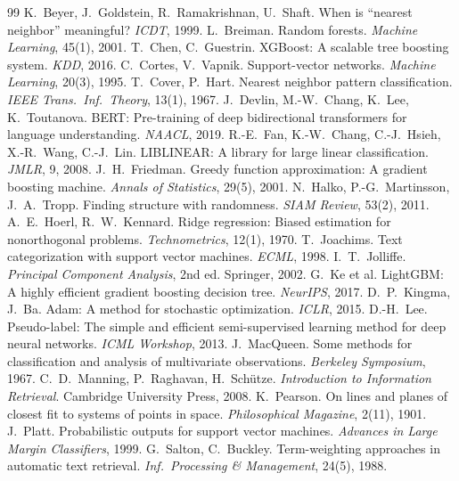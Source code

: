 \documentclass[11pt,a4paper]{article}
\begin{document}
\begin{thebibliography}{99}\small
{} K.~Beyer, J.~Goldstein, R.~Ramakrishnan, U.~Shaft. When is ``nearest neighbor'' meaningful? \emph{ICDT}, 1999.
 L.~Breiman. Random forests. \emph{Machine Learning}, 45(1), 2001.
 T.~Chen, C.~Guestrin. XGBoost: A scalable tree boosting system. \emph{KDD}, 2016.
 C.~Cortes, V.~Vapnik. Support-vector networks. \emph{Machine Learning}, 20(3), 1995.
 T.~Cover, P.~Hart. Nearest neighbor pattern classification. \emph{IEEE Trans.\ Inf.\ Theory}, 13(1), 1967.
 J.~Devlin, M.-W.~Chang, K.~Lee, K.~Toutanova. BERT: Pre-training of deep bidirectional transformers for language understanding. \emph{NAACL}, 2019.
 R.-E.~Fan, K.-W.~Chang, C.-J.~Hsieh, X.-R.~Wang, C.-J.~Lin. LIBLINEAR: A library for large linear classification. \emph{JMLR}, 9, 2008.
 J.~H.~Friedman. Greedy function approximation: A gradient boosting machine. \emph{Annals of Statistics}, 29(5), 2001.
 N.~Halko, P.-G.~Martinsson, J.~A.~Tropp. Finding structure with randomness. \emph{SIAM Review}, 53(2), 2011.
 A.~E.~Hoerl, R.~W.~Kennard. Ridge regression: Biased estimation for nonorthogonal problems. \emph{Technometrics}, 12(1), 1970.
 T.~Joachims. Text categorization with support vector machines. \emph{ECML}, 1998.
 I.~T.~Jolliffe. \emph{Principal Component Analysis}, 2nd ed. Springer, 2002.
 G.~Ke et al. LightGBM: A highly efficient gradient boosting decision tree. \emph{NeurIPS}, 2017.
 D.~P.~Kingma, J.~Ba. Adam: A method for stochastic optimization. \emph{ICLR}, 2015.
 D.-H.~Lee. Pseudo-label: The simple and efficient semi-supervised learning method for deep neural networks. \emph{ICML Workshop}, 2013.
 J.~MacQueen. Some methods for classification and analysis of multivariate observations. \emph{Berkeley Symposium}, 1967.
 C.~D.~Manning, P.~Raghavan, H.~Sch\"utze. \emph{Introduction to Information Retrieval}. Cambridge University Press, 2008.
 K.~Pearson. On lines and planes of closest fit to systems of points in space. \emph{Philosophical Magazine}, 2(11), 1901.
 J.~Platt. Probabilistic outputs for support vector machines. \emph{Advances in Large Margin Classifiers}, 1999.
 G.~Salton, C.~Buckley. Term-weighting approaches in automatic text retrieval. \emph{Inf.\ Processing \& Management}, 24(5), 1988.

\end{thebibliography}
\end{document}
